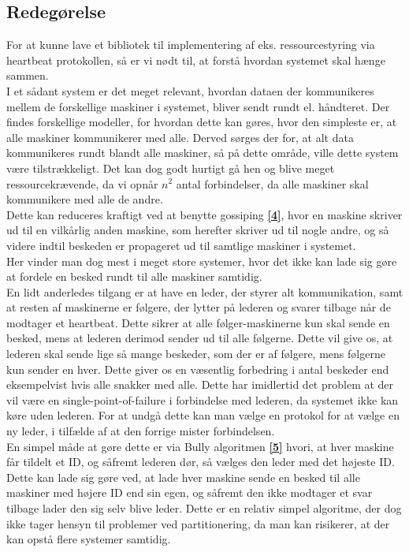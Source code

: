 \documentclass[a4paper,12pt]{article}
\begin{document}
\subsection{Redegørelse}
For at kunne lave et bibliotek til implementering af eks. ressourcestyring via heartbeat protokollen, så er vi nødt til, at forstå hvordan systemet skal hænge sammen.
\\
I et sådant system er det meget relevant, hvordan dataen der kommunikeres mellem de forskellige maskiner i systemet, bliver sendt rundt el. håndteret.
Der findes forskellige modeller, for hvordan dette kan gøres, hvor den simpleste er, at alle maskiner kommunikerer med alle.
Derved sørges der for, at alt data kommunikeres rundt blandt alle maskiner, så på dette område, ville dette system være tilstrækkeligt. 
Det kan dog godt hurtigt gå hen og blive meget ressourcekrævende, da vi opnår $n^2$ antal forbindelser, da alle maskiner skal kommunikere med alle de andre.
\\[5px]
Dette kan reduceres kraftigt ved at benytte gossiping \hyperref[fire]{\textbf{[4]}}, hvor en maskine skriver ud til en vilkårlig anden maskine, som herefter skriver ud til nogle andre, og så videre indtil beskeden er propageret ud til samtlige maskiner i systemet.
\\
Her vinder man dog mest i meget store systemer, hvor det ikke kan lade sig gøre at fordele en besked rundt til alle maskiner samtidig.
\\[5px]
En lidt anderledes tilgang er at have en leder, der styrer alt kommunikation, samt at resten af maskinerne er følgere, der lytter på lederen og svarer tilbage når de modtager et heartbeat. Dette sikrer at alle følger-maskinerne kun skal sende en besked, mens at lederen derimod sender ud til alle følgerne. Dette vil give os, at lederen skal sende lige så mange beskeder, som der er af følgere, mens følgerne kun sender en hver. 
Dette giver os en væsentlig forbedring i antal beskeder end eksempelvist hvis alle snakker med alle. Dette har imidlertid det problem at der vil være en single-point-of-failure i forbindelse med lederen, da systemet ikke kan køre uden lederen. For at undgå dette kan man vælge en protokol for at vælge en ny leder, i tilfælde af at den forrige mister forbindelsen. 
\\[5px]
En simpel måde at gøre dette er via Bully algoritmen \hyperref[fem]{\textbf{[5]}} hvori, at hver maskine får tildelt et ID, og såfremt lederen dør, så vælges den leder med det højeste ID. Dette kan lade sig gøre ved, at lade hver maskine sende en besked til alle maskiner med højere ID end sin egen, og såfremt den ikke modtager et svar tilbage lader den sig selv blive leder. Dette er en relativ simpel algoritme, der dog ikke tager hensyn til problemer ved partitionering, da man kan risikerer, at der kan opstå flere systemer samtidig. 
\end{document}
